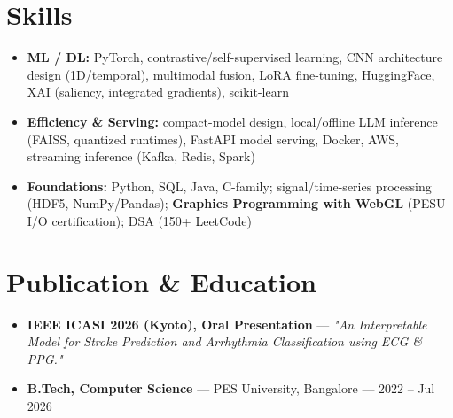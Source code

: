 \documentclass[10pt,a4paper]{article}
\begin{document}
\section*{Skills}
\begin{itemize}
\item \textbf{ML / DL:} PyTorch, contrastive/self-supervised learning, CNN architecture design (1D/temporal), multimodal fusion, LoRA fine-tuning, HuggingFace, XAI (saliency, integrated gradients), scikit-learn
\item \textbf{Efficiency \& Serving:} compact-model design, local/offline LLM inference (FAISS, quantized runtimes), FastAPI model serving, Docker, AWS, streaming inference (Kafka, Redis, Spark)
\item \textbf{Foundations:} Python, SQL, Java, C-family; signal/time-series processing (HDF5, NumPy/Pandas); \textbf{Graphics Programming with WebGL} (PESU I/O certification); DSA (150+ LeetCode)
\end{itemize}
\section*{Publication \& Education}
\begin{itemize}
\item \textbf{IEEE ICASI 2026 (Kyoto), Oral Presentation} --- \textit{"An Interpretable Model for Stroke Prediction and Arrhythmia Classification using ECG \& PPG."}
\item \textbf{B.Tech, Computer Science} --- PES University, Bangalore --- 2022 -- Jul 2026
\end{itemize}
\end{document}
